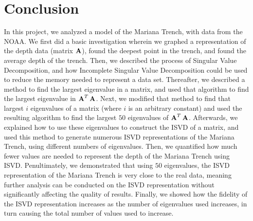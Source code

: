 \section{Conclusion} \label{sec:conc}

In this project, we analyzed a model of the Mariana Trench, with data from the NOAA. We first did a basic investigation wherein we graphed a representation of the depth data (matrix $\operatorname{\mathbf{A}}$), found the deepest point in the trench, and found the average depth of the trench. Then, we described the process of Singular Value Decomposition, and how Incomplete Singular Value Decomposition could be used to reduce the memory needed to represent a data set. Thereafter, we described a method to find the largest eigenvalue in a matrix, and used that algorithm to find the largest eigenvalue in $\operatorname{\mathbf{A}}^T\operatorname{\mathbf{A}}$. Next, we modified that method to find that largest $i$ eigenvalues of a matrix (where $i$ is an arbitrary constant) and used the resulting algorithm to find the largest $50$ eigenvalues of $\operatorname{\mathbf{A}}^T\operatorname{\mathbf{A}}$. Afterwards, we explained how to use these eigenvalues to construct the ISVD of a matrix, and used this method to generate numerous ISVD representations of the Mariana Trench, using different numbers of eigenvalues. Then, we quantified how much fewer values are needed to represent the depth of the Mariana Trench using ISVD. Penultimately, we demonstrated that using $50$ eigenvalues, the ISVD representation of the Mariana Trench is very close to the real data, meaning further analysis can be conducted on the ISVD representation without significantly affecting the quality of results. Finally, we showed how the fidelity of the ISVD representation increases as the number of eigenvalues used increases, in turn causing the total number of values used to increase. 

